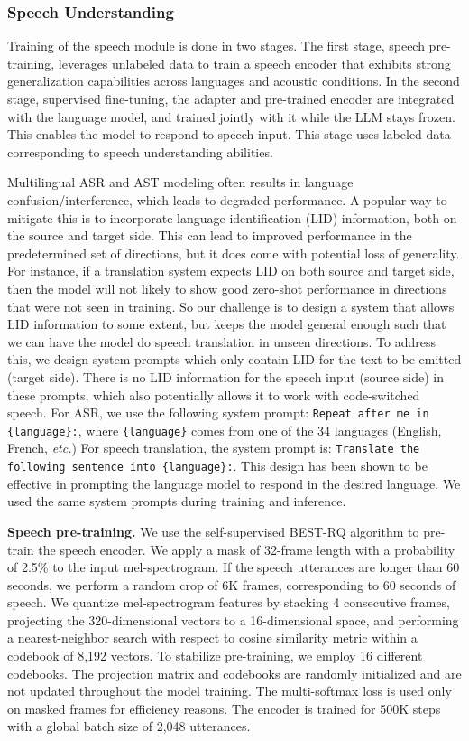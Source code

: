 \subsubsection{Speech Understanding}

Training of the speech module is done in two stages.
The first stage, speech pre-training, leverages unlabeled data to train a speech encoder that exhibits strong generalization capabilities across languages and acoustic conditions.
In the second stage, supervised fine-tuning, the adapter and pre-trained encoder are integrated with the language model, and trained jointly with it while the LLM stays frozen. This enables the model to respond to speech input.
This stage uses labeled data corresponding to speech understanding abilities.

Multilingual ASR and AST modeling often results in language confusion/interference, which leads to degraded performance. A popular way to mitigate this is to incorporate language identification (LID) information, both on the source and target side. This can lead to improved performance in the predetermined set of directions, but it does come with potential loss of generality. For instance, if a translation system expects LID on both source and target side, then the model will not likely to show good zero-shot performance in directions that were not seen in training.
So our challenge is to design a system that allows LID information to some extent, but keeps the model general enough such that we can have the model do speech translation in unseen directions.
To address this, we design system prompts which only contain LID for the text to be emitted (target side). There is no LID information for the speech input (source side) in these prompts, which also potentially allows it to work with code-switched speech.
For ASR, we use the following system prompt: {\tt Repeat after me in \{language\}:},
where {\tt \{language\}} comes from one of the 34 languages (English, French, \emph{etc.})
For speech translation, the system prompt is: {\tt Translate the following sentence into \{language\}:}.
This design has been shown to be effective in prompting the language model to respond in the desired language.
We used the same system prompts during training and inference.

\textbf{Speech pre-training.}
We use the self-supervised BEST-RQ algorithm \citep{chiu2022self} to pre-train the speech encoder.
We apply a mask of 32-frame length with a probability of 2.5\% to the input mel-spectrogram.
If the speech utterances are longer than 60 seconds, we perform a random crop of 6K frames, corresponding to 60 seconds of speech.
We quantize mel-spectrogram features by stacking 4 consecutive frames, projecting the 320-dimensional vectors to a 16-dimensional space, and performing a nearest-neighbor search with respect to cosine similarity metric within a codebook of 8,192 vectors.
To stabilize pre-training, we employ 16 different codebooks.
The projection matrix and codebooks are randomly initialized and are not updated throughout the model training.
The multi-softmax loss is used only on masked frames for efficiency reasons.
The encoder is trained for 500K steps with a global batch size of 2,048 utterances.

